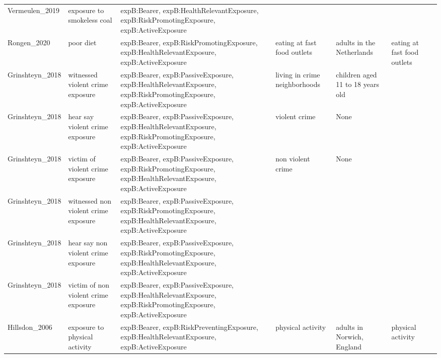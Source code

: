 \begin{tabular}{p{1cm}p{1cm}p{1cm}p{1cm}p{1cm}p{1cm}p{1cm}}
Vermeulen\_2019 & exposure to smokeless coal & expB:Bearer, expB:HealthRelevantExposure, expB:RiskPromotingExposure, expB:ActiveExposure &  &  &  &  \\
Rongen\_2020 & poor diet & expB:Bearer, expB:RiskPromotingExposure, expB:HealthRelevantExposure, expB:ActiveExposure & eating at fast food outlets & adults in the Netherlands & eating at fast food outlets &  \\
Grinshteyn\_2018 & witnessed violent crime exposure & expB:Bearer, expB:PassiveExposure, expB:HealthRelevantExposure, expB:RiskPromotingExposure, expB:ActiveExposure & living in crime neighborhoods & children aged 11 to 18 years old &  &  \\
Grinshteyn\_2018 & hear say violent crime exposure & expB:Bearer, expB:PassiveExposure, expB:HealthRelevantExposure, expB:RiskPromotingExposure, expB:ActiveExposure & violent crime & None &  &  \\
Grinshteyn\_2018 & victim of violent crime exposure & expB:Bearer, expB:PassiveExposure, expB:RiskPromotingExposure, expB:HealthRelevantExposure, expB:ActiveExposure & non violent crime & None &  &  \\
Grinshteyn\_2018 & witnessed non violent crime exposure & expB:Bearer, expB:PassiveExposure, expB:RiskPromotingExposure, expB:HealthRelevantExposure, expB:ActiveExposure &  &  &  &  \\
Grinshteyn\_2018 & hear say non violent crime exposure & expB:Bearer, expB:PassiveExposure, expB:RiskPromotingExposure, expB:HealthRelevantExposure, expB:ActiveExposure &  &  &  &  \\
Grinshteyn\_2018 & victim of non violent crime exposure & expB:Bearer, expB:PassiveExposure, expB:HealthRelevantExposure, expB:RiskPromotingExposure, expB:ActiveExposure &  &  &  &  \\
Hillsdon\_2006 & exposure to physical activity & expB:Bearer, expB:RiskPreventingExposure, expB:HealthRelevantExposure, expB:ActiveExposure & physical activity & adults in Norwich, England & physical activity &  \\
\bottomrule
\end{tabular}
